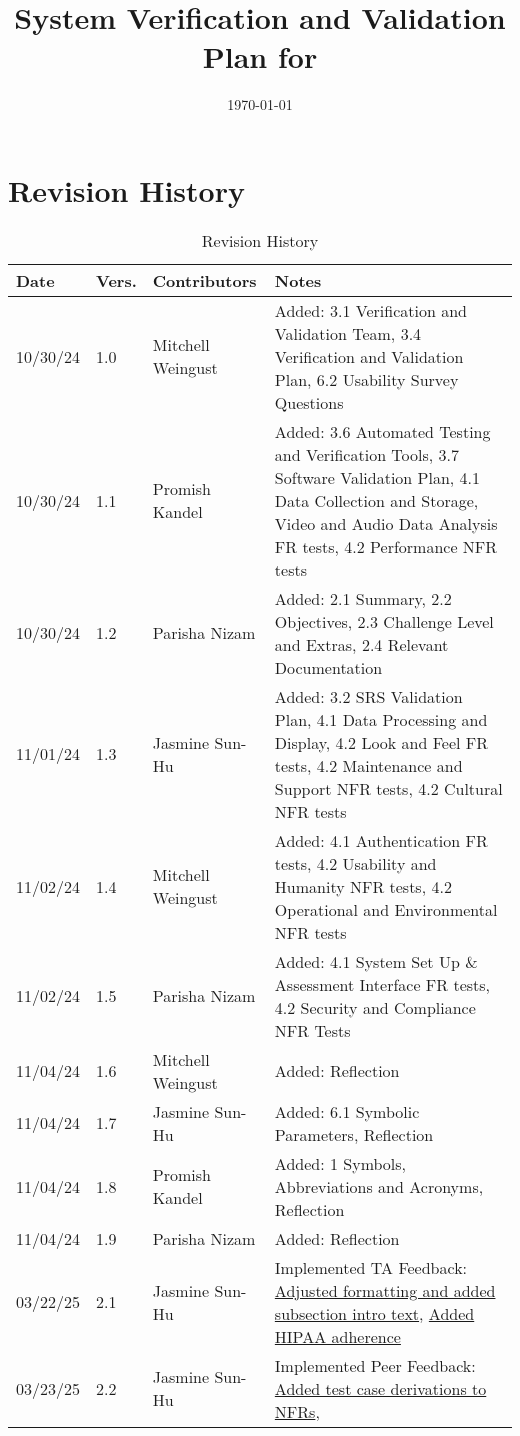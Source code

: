 \documentclass[12pt, titlepage]{article}
\begin{document}
\title{System Verification and Validation Plan for \progname{}} 
\author{\authname}
\date{\today}
	
\maketitle


\section*{Revision History}

\begin{table}[hp]
  \caption{Revision History} \label{TblRevisionHistory}
  \begin{tabularx}{\textwidth}{p{1.5cm}p{1cm}p{3.5cm}X}
  \toprule {\textbf{Date}} & {\textbf{Vers.}} & {\textbf{Contributors}} & {\textbf{Notes}}\\
  \midrule
  10/30/24 & 1.0 & Mitchell Weingust & Added: 3.1 Verification and Validation Team, 3.4 Verification and Validation Plan, 6.2 Usability Survey Questions \\
  10/30/24 & 1.1 & Promish Kandel & Added: 3.6 Automated Testing and Verification Tools, 3.7 Software Validation Plan, 4.1 Data Collection and Storage, Video and Audio Data Analysis FR tests, 4.2 Performance NFR tests \\
  10/30/24 & 1.2 & Parisha Nizam & Added: 2.1 Summary, 2.2 Objectives, 2.3 Challenge Level and Extras, 2.4 Relevant Documentation \\
  11/01/24 & 1.3 & Jasmine Sun-Hu & Added: 3.2 SRS Validation Plan, 4.1 Data Processing and Display, 4.2 Look and Feel FR tests, 4.2 Maintenance and Support NFR tests, 4.2 Cultural NFR tests \\
  11/02/24 & 1.4 & Mitchell Weingust & Added: 4.1 Authentication FR tests, 4.2 Usability and Humanity NFR tests, 4.2 Operational and Environmental NFR tests \\
  11/02/24 & 1.5 & Parisha Nizam & Added: 4.1 System Set Up \& Assessment Interface FR tests, 4.2 Security and Compliance NFR Tests \\
  11/04/24 & 1.6 & Mitchell Weingust & Added: Reflection \\
  11/04/24 & 1.7 & Jasmine Sun-Hu & Added: 6.1 Symbolic Parameters, Reflection \\
  11/04/24 & 1.8 & Promish Kandel & Added: 1 Symbols, Abbreviations and Acronyms, Reflection \\
  11/04/24 & 1.9 & Parisha Nizam & Added: Reflection \\
  03/22/25 & 2.1 & Jasmine Sun-Hu & Implemented TA Feedback: \href{https://github.com/parishanizam/TeleHealth/issues/292}{Adjusted formatting and added subsection intro text}, \href{https://github.com/parishanizam/TeleHealth/issues/293}{Added HIPAA adherence}\\
  03/23/25 & 2.2 & Jasmine Sun-Hu & Implemented Peer Feedback: \href{https://github.com/parishanizam/TeleHealth/issues/224}{Added test case derivations to NFRs}, \\
  \bottomrule
  \end{tabularx}
\end{table}
\end{document}
